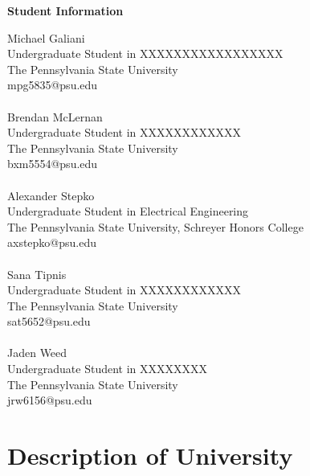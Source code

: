 \documentclass{article}
\begin{document}
\noindent\textbf{Student Information}\newline
\begin{multicols}{2}
Michael Galiani\\
Undergraduate Student in XXXXXXXXXXXXXXXXX\\
The Pennsylvania State University\\
mpg5835@psu.edu
\\~\\
Brendan McLernan\\
Undergraduate Student in XXXXXXXXXXXX\\
The Pennsylvania State University\\
bxm5554@psu.edu
\\~\\
Alexander Stepko\\
Undergraduate Student in Electrical Engineering\\
The Pennsylvania State University, Schreyer Honors College\\
axstepko@psu.edu
\\~\\
Sana Tipnis\\
Undergraduate Student in XXXXXXXXXXXX\\
The Pennsylvania State University\\
sat5652@psu.edu
\\~\\
Jaden Weed\\
Undergraduate Student in XXXXXXXX\\
The Pennsylvania State University\\
jrw6156@psu.edu
\newpage
\section{Description of University}\label{apxB}
\blindtext

\newpage

\end{multicols}
\end{document}

